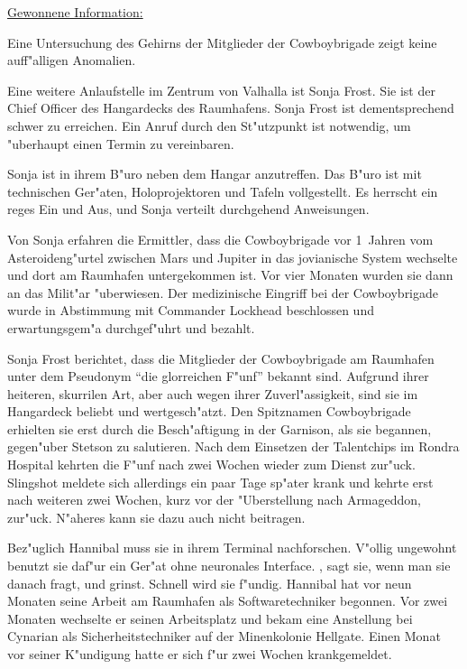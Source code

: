 \begin{remarks}
	\underline{Gewonnene Information:}
	
	Eine Untersuchung des Gehirns der Mitglieder der Cowboybrigade zeigt keine auff"alligen Anomalien.
\end{remarks}


Eine weitere Anlaufstelle im Zentrum von Valhalla ist Sonja Frost. Sie ist der Chief Officer des Hangardecks des Raumhafens. Sonja Frost ist dementsprechend schwer zu erreichen. Ein Anruf durch den St"utzpunkt ist notwendig, um "uberhaupt einen Termin zu vereinbaren.

Sonja ist in ihrem B"uro neben dem Hangar anzutreffen. Das B"uro ist mit technischen Ger"aten, Holoprojektoren und Tafeln vollgestellt. Es herrscht ein reges Ein und Aus, und Sonja verteilt durchgehend Anweisungen.

Von Sonja erfahren die Ermittler, dass die Cowboybrigade vor 1\half~Jahren vom Asteroideng"urtel zwischen Mars und Jupiter in das jovianische System wechselte und dort am Raumhafen untergekommen ist. Vor vier Monaten wurden sie dann an das Milit"ar "uberwiesen. Der medizinische Eingriff bei der Cowboybrigade wurde in Abstimmung mit Commander Lockhead beschlossen und erwartungsgem"a\3 durchgef"uhrt und bezahlt.

Sonja Frost berichtet, dass die Mitglieder der Cowboybrigade am Raumhafen unter dem Pseudonym ``die glorreichen F"unf'' bekannt sind. Aufgrund ihrer heiteren, skurrilen Art, aber auch wegen ihrer Zuverl"assigkeit, sind sie im Hangardeck beliebt und wertgesch"atzt. Den Spitznamen Cowboybrigade erhielten sie erst durch die Besch"aftigung in der Garnison, als sie begannen, gegen"uber Stetson zu salutieren. Nach dem Einsetzen der Talentchips im Rondra Hospital kehrten die F"unf nach zwei Wochen wieder zum Dienst zur"uck. Slingshot meldete sich allerdings ein paar Tage sp"ater krank und kehrte erst nach weiteren zwei Wochen, kurz vor der "Uberstellung nach Armageddon, zur"uck. N"aheres kann sie dazu auch nicht beitragen.

Bez"uglich Hannibal muss sie in ihrem Terminal nachforschen. V"ollig ungewohnt benutzt sie daf"ur ein Ger"at ohne neuronales Interface. , sagt sie, wenn man sie danach fragt, und grinst. Schnell wird sie f"undig. Hannibal hat vor neun Monaten seine Arbeit am Raumhafen als Softwaretechniker begonnen. Vor zwei Monaten wechselte er seinen Arbeitsplatz und bekam eine Anstellung bei Cynarian als Sicherheitstechniker auf der Minenkolonie Hellgate. Einen Monat vor seiner K"undigung hatte er sich f"ur zwei Wochen krankgemeldet.

